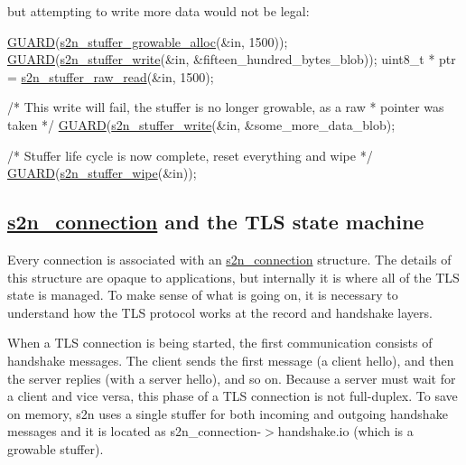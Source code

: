 but attempting to write more data would not be legal\+:


\begin{DoxyCode}
\hyperlink{s2n__safety_8h_ad400572229cc8e40f7996837deb680f3}{GUARD}(\hyperlink{s2n__stuffer_8c_aba979c37cd169d15368bcdf473360073}{s2n\_stuffer\_growable\_alloc}(&in, 1500));
\hyperlink{s2n__safety_8h_ad400572229cc8e40f7996837deb680f3}{GUARD}(\hyperlink{s2n__stuffer_8c_ad77ea23089bbeb19b897a73bf6ca3fde}{s2n\_stuffer\_write}(&in, &fifteen\_hundred\_bytes\_blob));
uint8\_t * ptr = \hyperlink{s2n__stuffer_8c_a5148294f6ed0bf894afc83a31ee4f8a5}{s2n\_stuffer\_raw\_read}(&in, 1500);

\textcolor{comment}{/* This write will fail, the stuffer is no longer growable, as a raw}
\textcolor{comment}{ * pointer was taken */}
\hyperlink{s2n__safety_8h_ad400572229cc8e40f7996837deb680f3}{GUARD}(\hyperlink{s2n__stuffer_8c_ad77ea23089bbeb19b897a73bf6ca3fde}{s2n\_stuffer\_write}(&in, &some\_more\_data\_blob);

\textcolor{comment}{/* Stuffer life cycle is now complete, reset everything and wipe */}
\hyperlink{s2n__safety_8h_ad400572229cc8e40f7996837deb680f3}{GUARD}(\hyperlink{s2n__stuffer_8c_a2b6b54f7856d92f06f823bc26d10f4ba}{s2n\_stuffer\_wipe}(&in));
\end{DoxyCode}


\subsection*{\hyperlink{structs2n__connection}{s2n\+\_\+connection} and the T\+LS state machine}

Every connection is associated with an \hyperlink{structs2n__connection}{s2n\+\_\+connection} structure. The details of this structure are opaque to applications, but internally it is where all of the T\+LS state is managed. To make sense of what is going on, it is necessary to understand how the T\+LS protocol works at the record and handshake layers.

When a T\+LS connection is being started, the first communication consists of handshake messages. The client sends the first message (a client hello), and then the server replies (with a server hello), and so on. Because a server must wait for a client and vice versa, this phase of a T\+LS connection is not full-\/duplex. To save on memory, s2n uses a single stuffer for both incoming and outgoing handshake messages and it is located as s2n\+\_\+connection-\/$>$handshake.\+io (which is a growable stuffer).

